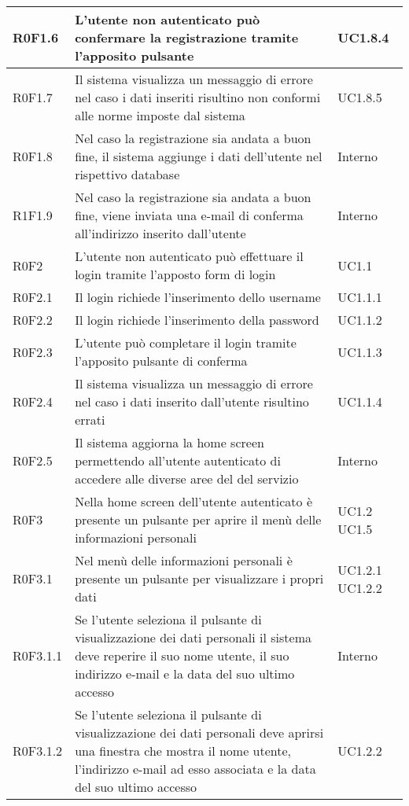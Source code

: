 \begin{center}
\begin{longtable}{| p{2cm} | p{8cm} | p{2cm} |}
		\hline
		R0F1.6  &  L'utente non autenticato può confermare la registrazione tramite l'apposito pulsante  &  UC1.8.4 \\
		\hline
		R0F1.7  &  Il sistema visualizza un messaggio di errore nel caso i dati inseriti risultino non conformi alle norme imposte dal sistema  &  UC1.8.5 \\
		\hline
		R0F1.8  &  Nel caso la registrazione sia andata a buon fine, il sistema aggiunge i dati dell'utente nel rispettivo database  &  Interno \\
		\hline
		R1F1.9  &  Nel caso la registrazione sia andata a buon fine, viene inviata una e-mail di conferma all'indirizzo inserito dall'utente  &  Interno \\
		\hline
		R0F2  &  L'utente non autenticato può effettuare il login tramite l'apposto form di login  &  UC1.1 \\
		\hline
		R0F2.1  &  Il login richiede l'inserimento dello username  &  UC1.1.1 \\
		\hline
		R0F2.2  &  Il login richiede l'inserimento della password  &  UC1.1.2 \\
		\hline
		R0F2.3  &  L'utente può completare il login tramite l'apposito pulsante di conferma  &  UC1.1.3 \\
		\hline
		R0F2.4  &  Il sistema visualizza un messaggio di errore nel caso i dati inserito dall'utente risultino errati  &  UC1.1.4 \\
		\hline
		R0F2.5  &  Il sistema aggiorna la home screen permettendo all'utente autenticato di accedere alle diverse aree del del servizio  &  Interno  \\
		\hline
		R0F3  &  Nella home screen dell'utente autenticato è presente un pulsante per aprire il menù delle informazioni personali  &  UC1.2 \newline UC1.5 \\
		\hline
		R0F3.1  &  Nel menù delle informazioni personali è presente un pulsante per visualizzare i propri dati  &  UC1.2.1 \newline UC1.2.2 \\
		\hline
		R0F3.1.1  &  Se l'utente seleziona il pulsante di visualizzazione dei dati personali il sistema deve reperire il suo nome utente, il suo indirizzo e-mail e la data del suo ultimo accesso &  Interno \\
		\hline
		R0F3.1.2  &  Se l'utente seleziona il pulsante di visualizzazione dei dati personali deve aprirsi una finestra che mostra il nome utente, l'indirizzo e-mail ad esso associata e la data del suo ultimo accesso &  UC1.2.2 \\

\end{longtable}
\end{center}
